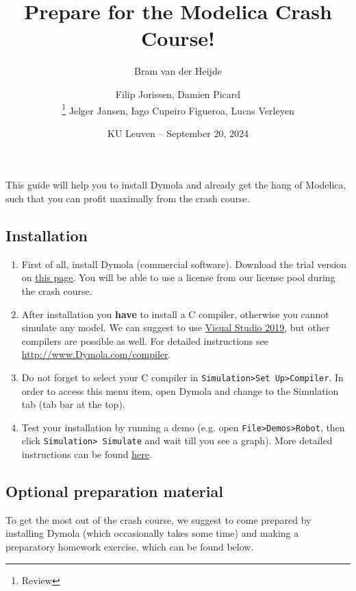 \documentclass[10pt,a4paper]{article}
\author{Bram van der Heijde}
\begin{document}
	
	\title{Prepare for the Modelica Crash Course!}
	\author{Filip Jorissen, Damien Picard\\ \thanks{Review} Jelger Jansen, Iago Cupeiro Figueroa, Lucas Verleyen} 
	\date{KU Leuven -- September 20, 2024}
	\maketitle

This guide will help you to install Dymola and already get the hang of Modelica, such that you can profit maximally from the crash course. 

\subsection*{Installation}

\begin{enumerate}
	\item First of all, install Dymola (commercial software).  Download the trial version on
	\href{https://www.3ds.com/products-services/catia/products/dymola/trial-version/}{this page}. You will be able to use a license from our license pool during the crash course. 
	\item After installation you \textbf{have} to install a C compiler, otherwise you 
	cannot simulate any model. We can suggest to use \href{https://visualstudio.microsoft.com/fr/vs/older-downloads/}{Visual Studio 2019}, but other compilers are possible as well. For detailed instructions see
	\href{http://www.Dymola.com/compiler}{http://www.Dymola.com/compiler}. 
	\item Do not forget to select your C compiler in \texttt{Simulation>Set Up>Compiler}. In order to access this menu item, open Dymola and change to the Simulation tab (tab bar at the top).
	\item Test your installation by running a demo (e.g. open \texttt{File>Demos>Robot}, then 
	click \texttt{Simulation> Simulate} and wait till you see a graph). More detailed instructions can be found \href{https://www.3ds.com/fileadmin/PRODUCTS/CATIA/DYMOLA/PDF/Installation.pdf}{here}.
\end{enumerate}


\subsection*{Optional preparation material}
To get the most out of the crash course, we suggest to come prepared by installing Dymola (which occasionally takes some time) and making a preparatory homework exercise, which can be found below. 
\end{document}
